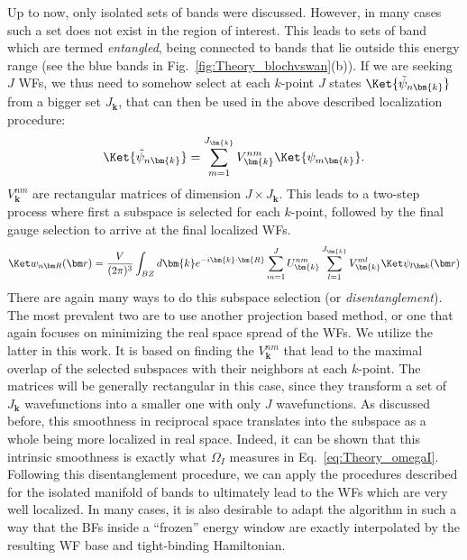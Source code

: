 Up to now, only isolated sets of bands were discussed. However, in many cases such a set does not exist in the region of interest.
This leads to sets of band which are termed {\it entangled}, being connected to bands that lie outside this energy range (see the blue bands in Fig.~\ref{fig:Theory_blochvswan}(b)).
If we are seeking $J$ WFs, we thus need to somehow select at each $k$-point $J$ states $\Ket{\tilde{\psi}_{n\bm{k}}}$ from a bigger set $J_{\bm{k}}$, that can then be used in the above described localization procedure:
\begin{equation}
	\Ket{\tilde{\psi}_{n\bm{k}}} = \sum_{m=1}^{J_{\bm{k}}}V^{nm}_{\bm{k}} \Ket{\psi_{m\bm{k}}}.
\end{equation}
$V^{nm}_{\bm{k}}$ are rectangular matrices of dimension $J\times J_{\bm{k}}$.
This leads to a two-step process where first a subspace is selected for each $k$-point, followed by the final gauge selection to arrive at the final localized WFs.
\begin{equation}
	\WanKet{n}{R} = \frac{V}{(2\pi)^3} \int_{BZ} d\bm{k} e^{-i \bm{k} \cdot \bm{R}} \sum_{m=1}^J U^{nm}_{\bm{k}} \sum_{l=1}^{J_{\bm{k}}} V^{ml}_{\bm{k}} \BlochKet{l}
\end{equation}
There are again many ways to do this subspace selection (or {\it disentanglement}).
The most prevalent two are to use another projection based method, or one that again focuses on minimizing the real space spread of the WFs.
We utilize the latter in this work.
It is based on finding the $V^{nm}_{\bm{k}}$ that lead to the maximal overlap of the selected subspaces with their neighbors at each $k$-point.
The matrices will be generally rectangular in this case, since they transform a set of $J_{\bm{k}}$ wavefunctions into a smaller one with only $J$ wavefunctions.
As discussed before, this smoothness in reciprocal space translates into the subspace as a whole being more localized in real space.
Indeed, it can be shown \cite{Marzari2012} that this intrinsic smoothness is exactly what $\Omega_I$ measures in Eq.~\ref{eq:Theory_omegaI}. 
Following this disentanglement procedure, we can apply the procedures described for the isolated manifold of bands to ultimately lead to the WFs which are very well localized.
In many cases, it is also desirable to adapt the algorithm in such a way that the BFs inside a ``frozen'' energy window are exactly interpolated by the resulting WF base and tight-binding Hamiltonian.

